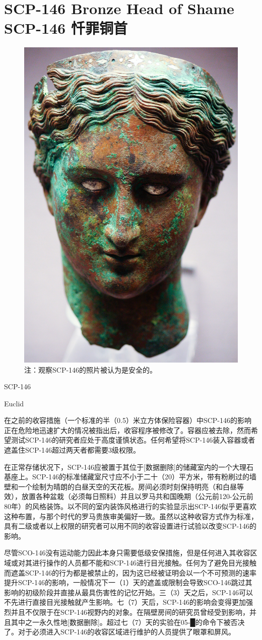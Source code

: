 \chapter[SCP-146 忏罪铜首]{
    SCP-146 Bronze Head of Shame\\
    SCP-146 忏罪铜首
}

\label{chap:SCP-146}

\begin{figure}[H]
    \centering
    \includegraphics[width=0.5\linewidth]{images/SCP.146.jpg}
    \caption*{注：观察SCP-146的照片被认为是安全的。}
\end{figure}

SCP-146

Euclid

在之前的收容措施（一个标准的半（0.5）米立方体保险容器）中SCP-146的影响正在危险地迅速扩大的情况被指出后，收容程序被修改了。容器应被去除，然而希望测试SCP-146的研究者应处于高度谨慎状态。任何希望将SCP-146装入容器或者遮盖住SCP-146超过两天者都需要3级权限。

在正常存储状况下，SCP-146应被置于其位于{[}数据删除]的储藏室内的一个大理石基座上。SCP-146的标准储藏室尺寸应不小于二十（20）平方米，带有粉刷过的墙壁和一个绘制为晴朗的白昼天空的天花板。房间必须时刻保持明亮（和白昼等效），放置各种盆栽（必须每日照料）并且以罗马共和国晚期（公元前120-公元前80年）的风格装饰。以不同的室内装饰风格进行的实验显示出SCP-146似乎更喜欢这种布置，与那个时代的罗马贵族审美偏好一致。虽然以这种收容方式作为标准，具有二级或者以上权限的研究者可以用不同的收容设置进行试验以改变SCP-146的影响。

尽管SCO-146没有运动能力因此本身只需要低级安保措施，但是任何进入其收容区域或对其进行操作的人员都不能和SCP-146进行目光接触。任何为了避免目光接触而遮盖SCP-146的行为都是被禁止的，因为这已经被证明会以一个不可预测的速率提升SCP-146的影响，一般情况下一（1）天的遮盖或限制会导致SCO-146跳过其影响的初级阶段并直接从最具伤害性的记忆开始。三（3）天之后，SCP-146可以不先进行直接目光接触就产生影响。七（7）天后，SCP-146的影响会变得更加强烈并且不仅限于在SCP-146视野内的对象。在隔壁房间的研究员曾经受到影响，并且其中之一永久性地{[}数据删除]。超过七（7）天的实验在05-█的命令下被否决了。对于必须进入SCP-146的收容区域进行维护的人员提供了眼罩和屏风。

